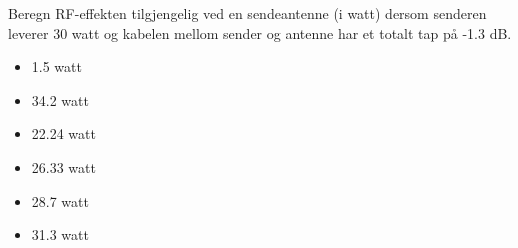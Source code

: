 Beregn RF-effekten tilgjengelig ved en sendeantenne (i watt) dersom senderen leverer 30 watt og kabelen mellom sender og antenne har et totalt tap på -1.3 dB.

\begin{itemize}
\item{} 1.5 watt
\vskip 5pt 
\item{} 34.2 watt
\vskip 5pt 
\item{} 22.24 watt
\vskip 5pt 
\item{} 26.33 watt
\vskip 5pt 
\item{} 28.7 watt
\vskip 5pt 
\item{} 31.3 watt
\end{itemize}



